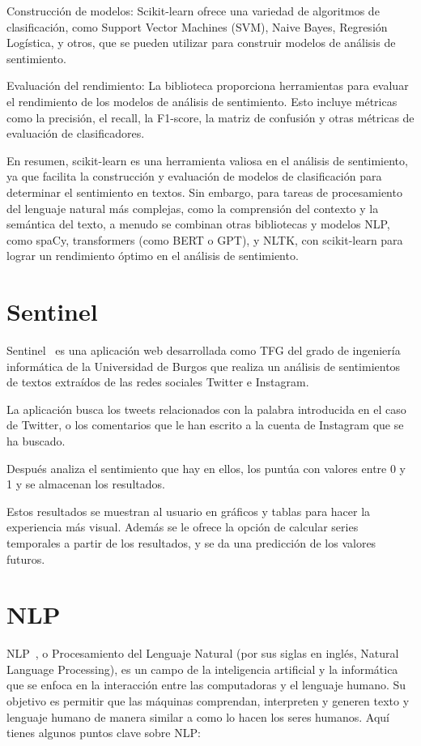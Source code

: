 Construcción de modelos: Scikit-learn ofrece una variedad de algoritmos de clasificación, como Support Vector Machines (SVM), Naive Bayes, Regresión Logística, y otros, que se pueden utilizar para construir modelos de análisis de sentimiento.

Evaluación del rendimiento: La biblioteca proporciona herramientas para evaluar el rendimiento de los modelos de análisis de sentimiento. Esto incluye métricas como la precisión, el recall, la F1-score, la matriz de confusión y otras métricas de evaluación de clasificadores.

En resumen, scikit-learn es una herramienta valiosa en el análisis de sentimiento, ya que facilita la construcción y evaluación de modelos de clasificación para determinar el sentimiento en textos. Sin embargo, para tareas de procesamiento del lenguaje natural más complejas, como la comprensión del contexto y la semántica del texto, a menudo se combinan otras bibliotecas y modelos NLP, como spaCy, transformers (como BERT o GPT), y NLTK, con scikit-learn para lograr un rendimiento óptimo en el análisis de sentimiento.


\section{Sentinel}
Sentinel~\cite{Sentinel1} es una aplicación web desarrollada como TFG del grado de ingeniería informática de la Universidad de Burgos que realiza un análisis de sentimientos de textos extraídos de las redes sociales Twitter e Instagram.

La aplicación busca los tweets relacionados con la palabra introducida en el caso de Twitter, o los comentarios que le han escrito a la cuenta de Instagram que se ha buscado.

Después analiza el sentimiento que hay en ellos, los puntúa con valores entre 0 y 1 y se almacenan los resultados.

Estos resultados se muestran al usuario en gráficos y tablas para hacer la experiencia más visual. Además se le ofrece la opción de calcular series temporales a partir de los resultados, y se da una predicción de los valores futuros.


\section{NLP}
NLP~\cite{nlp1}, o Procesamiento del Lenguaje Natural (por sus siglas en inglés, Natural Language Processing), es un campo de la inteligencia artificial y la informática que se enfoca en la interacción entre las computadoras y el lenguaje humano. Su objetivo es permitir que las máquinas comprendan, interpreten y generen texto y lenguaje humano de manera similar a como lo hacen los seres humanos. Aquí tienes algunos puntos clave sobre NLP:

